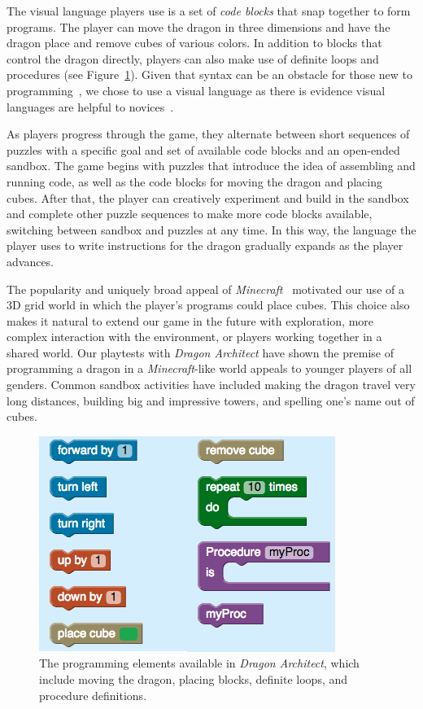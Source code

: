 \documentclass{sig-alternate}
\newcommand{\gametitle}{{\emph{Dragon Architect}}}
\begin{document}
The visual language players use is a set of \emph{code blocks} that snap together to form programs. 
The player can move the dragon in three dimensions and have the dragon place and remove cubes of various colors. 
In addition to blocks that control the dragon directly, players can also make use of definite loops and procedures (see Figure~\ref{fig:toolbox}).
Given that syntax can be an obstacle for those new to programming~\cite{stefik2013syntax}, we chose to use a visual language as there is evidence visual languages are helpful to novices~\cite{whitley1997visual}.

As players progress through the game, they alternate between short sequences of puzzles with a specific goal and set of available code blocks and an open-ended sandbox.
The game begins with puzzles that introduce the idea of assembling and running code, as well as the code blocks for moving the dragon and placing cubes.
After that, the player can creatively experiment and build in the sandbox and complete other puzzle sequences to make more code blocks available, switching between sandbox and puzzles at any time. 
In this way, the language the player uses to write instructions for the dragon gradually expands as the player advances.

The popularity and uniquely broad appeal of \emph{Minecraft}~\cite{minecraft} motivated our use of a 3D grid world in which the player's programs could place cubes.
This choice also makes it natural to extend our game in the future with exploration, more complex interaction with the environment, or players working together in a shared world.
Our playtests with \gametitle{} have shown the premise of programming a dragon in a \emph{Minecraft}-like world appeals to younger players of all genders.
Common sandbox activities have included making the dragon travel very long distances, building big and impressive towers, and spelling one's name out of cubes.

\begin{figure}[htb]
  \centering
  \includegraphics[width=\columnwidth]{images/toolbox-wide}
  \caption{The programming elements available in \gametitle{}, which include moving the dragon, placing blocks, definite loops, and procedure definitions.}
  \label{fig:toolbox}
\end{figure}
\end{document}
